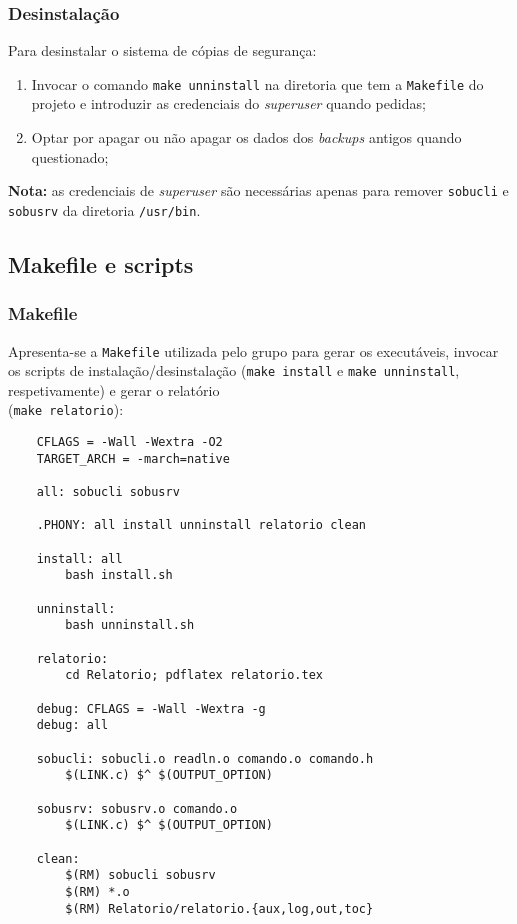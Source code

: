 \documentclass[a4paper,12pt,titlepage,portuguese]{article}
\begin{document}
\subsubsection{Desinstalação}

Para desinstalar o sistema de cópias de segurança:
	\begin{enumerate}
		\item Invocar o comando \texttt{make unninstall} na diretoria que tem a \texttt{Makefile} do projeto e introduzir as credenciais do \emph{superuser} quando pedidas;
		\item Optar por apagar ou não apagar os dados dos \emph{backups} antigos quando questionado;
	\end{enumerate}
\textbf{Nota:} as credenciais de \emph{superuser} são necessárias apenas para remover \texttt{sobucli} e \texttt{sobusrv} da diretoria \texttt{/usr/bin}.

\newpage

\subsection{Makefile e scripts}

\subsubsection{Makefile}
Apresenta-se a \texttt{Makefile} utilizada pelo grupo para gerar os executáveis, invocar os scripts de instalação/desinstalação (\texttt{make install} e \texttt{make unninstall}, respetivamente) e gerar o relatório \\(\texttt{make relatorio}):
	\begin{verbatim}
	CFLAGS = -Wall -Wextra -O2
	TARGET_ARCH = -march=native

	all: sobucli sobusrv

	.PHONY: all install unninstall relatorio clean

	install: all
		bash install.sh

	unninstall:
		bash unninstall.sh

	relatorio:
		cd Relatorio; pdflatex relatorio.tex

	debug: CFLAGS = -Wall -Wextra -g
	debug: all

	sobucli: sobucli.o readln.o comando.o comando.h
		$(LINK.c) $^ $(OUTPUT_OPTION)

	sobusrv: sobusrv.o comando.o
		$(LINK.c) $^ $(OUTPUT_OPTION)

	clean:
		$(RM) sobucli sobusrv
		$(RM) *.o
		$(RM) Relatorio/relatorio.{aux,log,out,toc}
	\end{verbatim}
\end{document}
